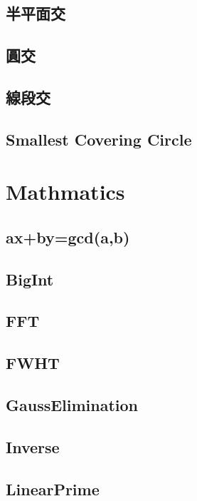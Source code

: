 \subsection{半平面交}

\subsection{圓交}

\subsection{線段交}

\subsection{Smallest Covering Circle}


\section{Mathmatics}

\subsection{ax+by=gcd(a,b)}

\subsection{BigInt}

\subsection{FFT}

\subsection{FWHT}

\subsection{GaussElimination}

\subsection{Inverse}

\subsection{LinearPrime}

